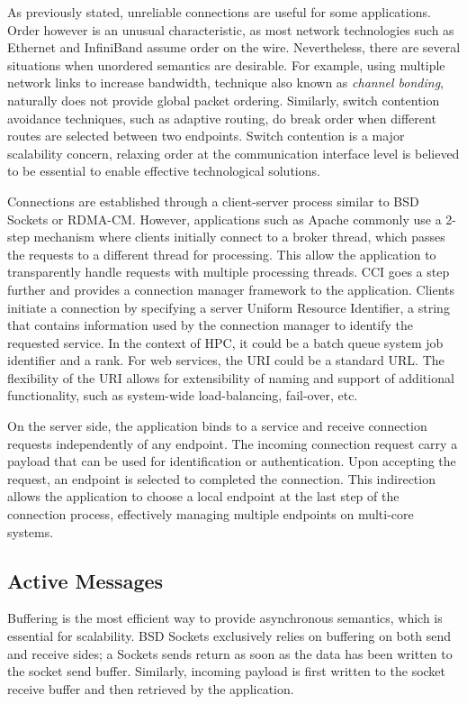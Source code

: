 As previously stated, unreliable connections are useful for some applications. 
Order however is an unusual characteristic, as most network technologies such 
as Ethernet and InfiniBand assume order on the wire. 
Nevertheless, there are several situations when unordered semantics are 
desirable. For example, using multiple network links to increase bandwidth, 
technique also known as \emph{channel bonding}, naturally does not provide 
global packet ordering. Similarly, switch contention avoidance techniques, 
such as adaptive routing, do break order when different routes are selected 
between two endpoints. Switch contention is a major scalability concern, 
relaxing order at the communication interface level is believed to be 
essential to enable effective technological solutions.

Connections are established through a client-server process similar to 
BSD Sockets or RDMA-CM\cite{rdma-cm}. However, applications such as 
Apache\cite{apache} commonly use a 2-step mechanism where clients 
initially connect to a broker thread, which passes the requests to a 
different thread for processing. This allow the application to 
transparently handle requests with multiple processing threads.
CCI goes a step further and provides a connection manager framework to 
the application. Clients initiate a connection by specifying a server 
Uniform Resource Identifier, a string that contains information used 
by the connection manager to identify the requested service. In the context of 
HPC, it could be a batch queue system job identifier and a rank. For web 
services, the URI could be a standard URL. The flexibility of the URI allows 
for extensibility of naming and support of additional functionality, such as 
system-wide load-balancing, fail-over, etc.

On the server side, the application binds to a service and receive 
connection requests independently of any endpoint. The incoming connection 
request carry a payload that can be used for identification or authentication. 
Upon accepting the request, an endpoint is selected to completed the 
connection. This indirection allows the application to choose a local endpoint 
at the last step of the connection process, effectively managing multiple 
endpoints on multi-core systems.

\subsection{Active Messages}
Buffering is the most efficient way to provide asynchronous semantics, which 
is essential for scalability. BSD Sockets exclusively relies on buffering on both 
send and receive sides; a Sockets sends return as soon as the data has been 
written to the socket send buffer. Similarly, incoming payload is first 
written to the socket receive buffer and then retrieved by the application.

